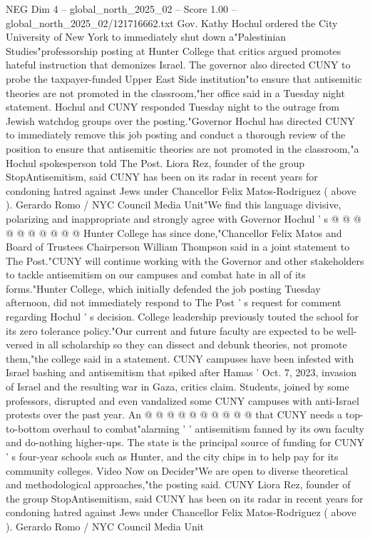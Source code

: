 \begin{textsample}{NEG Dim 4 – global\_north\_2025\_02 – Score 1.00 – global\_north\_2025\_02/121716662.txt}  \label{ex:f4_neg_410}
Gov.
Kathy Hochul ordered the City University of New York to immediately shut down a"Palestinian Studies"professorship posting at Hunter College that critics argued promotes hateful instruction that demonizes Israel.
The governor also directed CUNY to probe the taxpayer-funded Upper East Side institution"to ensure that antisemitic theories are not promoted in the classroom,"her office said in a Tuesday night statement.
Hochul and CUNY responded Tuesday night to the outrage from Jewish watchdog groups over the posting."Governor Hochul has directed CUNY to immediately remove this job posting and conduct a thorough review of the position to ensure that antisemitic theories are not promoted in the classroom,"a Hochul spokesperson told The Post.
Liora Rez, founder of the group StopAntisemitism, said CUNY has been on its radar in recent years for condoning hatred against Jews under Chancellor Felix Matos-Rodriguez ( above ).
Gerardo Romo / NYC Council Media Unit"We find this language divisive, polarizing and inappropriate and strongly agree with Governor Hochul ' s @ @ @ @ @ @ @ @ @ @ Hunter College has since done,"Chancellor Felix Matos and Board of Trustees Chairperson William Thompson said in a joint statement to The Post."CUNY will continue working with the Governor and other stakeholders to tackle antisemitism on our campuses and combat hate in all of its forms."Hunter College, which initially defended the job posting Tuesday afternoon, did not immediately respond to The Post ' s request for comment regarding Hochul ' s decision.
College leadership previously touted the school for its zero tolerance policy."Our current and future faculty are expected to be well-versed in all scholarship so they can dissect and debunk theories, not promote them,"the college said in a statement.
CUNY campuses have been infested with Israel bashing and antisemitism that spiked after Hamas ' Oct. 7, 2023, invasion of Israel and the resulting war in Gaza, critics claim.
Students, joined by some professors, disrupted and even vandalized some CUNY campuses with anti-Israel protests over the past year.
An @ @ @ @ @ @ @ @ @ @ that CUNY needs a top-to-bottom overhaul to combat"alarming ' ' antisemitism fanned by its own faculty and do-nothing higher-ups.
The state is the principal source of funding for CUNY ' s four-year schools such as Hunter, and the city chips in to help pay for its community colleges.
Video Now on Decider"We are open to diverse theoretical and methodological approaches,"the posting said.
CUNY Liora Rez, founder of the group StopAntisemitism, said CUNY has been on its radar in recent years for condoning hatred against Jews under Chancellor Felix Matos-Rodriguez ( above ).
Gerardo Romo / NYC Council Media Unit

\end{textsample}
